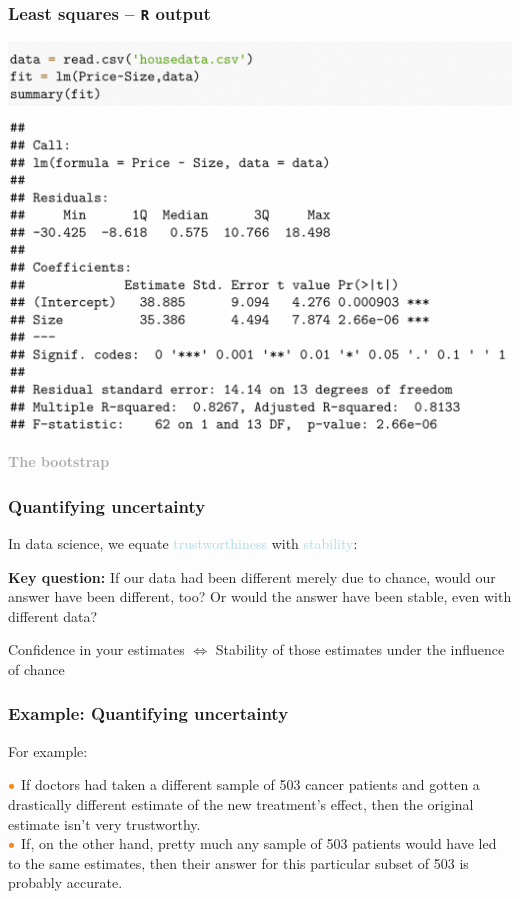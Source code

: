 \documentclass{beamer}
\newcommand{\bo}[1]{\textcolor{burntorange}{#1}}
\newcommand{\lb}[1]{\textcolor{lightblue}{#1}}
\newcommand{\dg}[1]{\textcolor{darkgray}{#1}}
\newcommand{\sk}{\vspace{.5cm}}
\begin{document}
\begin{frame}
\frametitle{Least squares -- {\tt R} output} 

\includegraphics[scale=0.50]{figures/pred1}

\end{frame}


\begin{frame}
\sk\sk
	\dg{\bf The bootstrap }
\end{frame}


\begin{frame}
	\frametitle{Quantifying uncertainty}
In data science, we equate \lb{trustworthiness} with \lb{stability}: \\ \sk\sk

\textbf{\bo{Key question:}}
If our data had been different merely due to chance, would our answer have been different, too?
Or would the answer have been stable, even with different data? \\ \sk\sk

Confidence in your estimates $\iff$ Stability of those estimates under the influence of chance
\end{frame}


\begin{frame}
	\frametitle{Example: Quantifying uncertainty}

For example: \\ \sk\sk

$\bo{\bullet}$ If doctors had taken a different sample of 503 cancer patients and gotten a drastically different estimate of the new treatment's effect, then the original estimate isn't very trustworthy. \\ \sk
$\bo{\bullet}$ If, on the other hand, pretty much any sample of 503 patients would have led to the same estimates, then their answer for this particular subset of 503 is probably accurate.

\end{frame}
\end{document}

